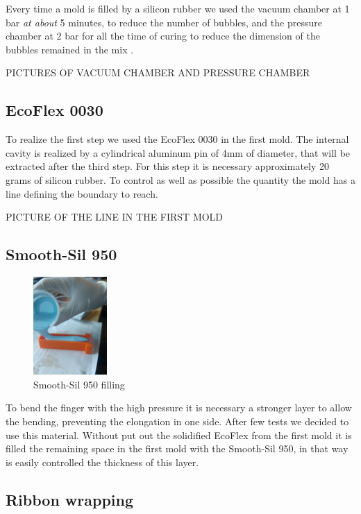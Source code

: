 \documentclass{article}
\begin{document}
Every time a mold is filled by a silicon rubber we used the vacuum chamber at 1 bar \emph{at about} 5 minutes, to reduce the number of bubbles, and the pressure chamber at 2 bar for all the time of curing to reduce the dimension of the bubbles remained in the mix .

PICTURES OF VACUUM CHAMBER AND PRESSURE CHAMBER


\subsection{EcoFlex 0030}
To realize the first step we used the EcoFlex 0030 in the first mold. The internal cavity is realized by a cylindrical aluminum pin of 4mm of diameter, that will be extracted after the third step.
For this step it is necessary approximately 20 grams of silicon rubber. 
To control as well as possible the quantity the mold has a line defining the boundary to reach.

PICTURE OF THE LINE IN THE FIRST MOLD


\subsection{Smooth-Sil 950}

\begin{figure}
\centering
    \includegraphics[width=0.25\textwidth]{Pictures/fingerOnToroidal/SmoothSil950filling.jpg}
    \caption{Smooth-Sil 950 filling}
    \label{fig:SmoothSil950filling}
\end{figure}

To bend the finger with the high pressure it is necessary a stronger layer to allow the bending, preventing the elongation in one side.
After few tests we decided to use this material. Without put out the solidified EcoFlex from the first mold it is filled the remaining space in the first mold with the Smooth-Sil 950, in that way is easily controlled the thickness of this layer.

\subsection{Ribbon wrapping}
\end{document}
